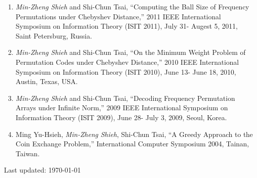 \documentclass[A4]{article}
\def\footerlink{}
\begin{document}
\begin{enumerate}
\item \emph{Min-Zheng Shieh} and Shi-Chun Tsai, ``Computing the Ball Size of Frequency Permutations under Chebyshev Distance,'' 2011 IEEE International Symposium on Information Theory (ISIT 2011), July 31- Augest 5, 2011, Saint Petersburg, Russia.
\item \emph{Min-Zheng Shieh} and Shi-Chun Tsai, ``On the Minimum Weight Problem of Permutation Codes under Chebyshev Distance,'' 2010 IEEE International Symposium on Information Theory (ISIT 2010), June 13- June 18, 2010, Austin, Texas, USA.
\item \emph{Min-Zheng Shieh} and Shi-Chun Tsai, ``Decoding Frequency Permutation Arrays under Infinite Norm,'' 2009 IEEE International Symposium on Information Theory (ISIT 2009), June 28- July 3, 2009, Seoul, Korea.
\item Ming Yu-Hsieh, \emph{Min-Zheng Shieh}, Shi-Chun Tsai, ``A Greedy Approach to the Coin Exchange Problem,'' International Computer Symposium 2004, Tainan, Taiwan.
\end{enumerate}

\bigskip

\begin{center}
  \begin{footnotesize}
    Last updated: \today \\
    \href{\footerlink}{\texttt{\footerlink}}
  \end{footnotesize}
\end{center}
\end{document}
